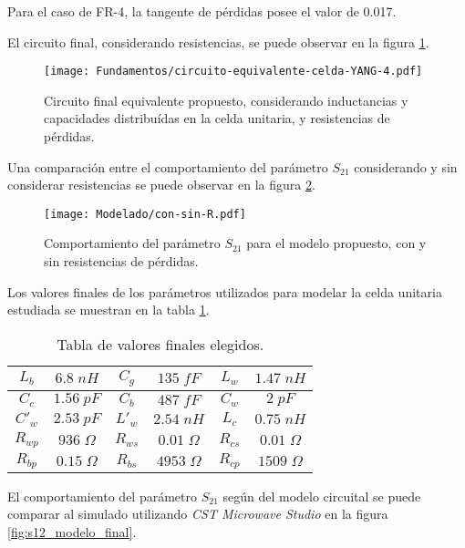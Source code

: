 Para el caso de FR-4, la tangente de pérdidas posee el valor de 0.017.

El circuito final, considerando resistencias, se puede observar en la figura \ref{fig:modelo-circuital-todojunto-conR}.

\begin{figure}[h]
	\centering
	\texttt{[image: Fundamentos/circuito-equivalente-celda-YANG-4.pdf]}
	\caption{Circuito final equivalente propuesto, considerando inductancias y capacidades distribuídas en la celda unitaria, y resistencias de pérdidas.}
	\label{fig:modelo-circuital-todojunto-conR}
\end{figure}

Una comparación entre el comportamiento del parámetro $S_{21}$ considerando y sin considerar resistencias se puede observar en la figura \ref{fig:con-sin-R}.

\begin{figure}[h]
	\centering
	\texttt{[image: Modelado/con-sin-R.pdf]}
	\caption{Comportamiento del parámetro $S_{21}$ para el modelo propuesto, con y sin resistencias de pérdidas.}
	\label{fig:con-sin-R}
\end{figure}

Los valores finales de los parámetros utilizados para modelar la celda unitaria estudiada se muestran en la tabla \ref{table:valoresFinalesModelo}.

\begin{table}
	\centering
	\begin{tabular}{| c c | c c | c c |}
		\hline 
		$L_b$ & $6.8\; nH$ & $C_g$ & $135\; fF$ & $L_w$ & $1.47\; nH$ \\
		\hline
		$C_c$ & $1.56\; pF$ & $C_b$ & $487 \;fF$ & $C_w$ & $2 \; pF$\\
		\hline
		$C'_w$ & $2.53\; pF$ & $L'_w$ & $2.54\; nH$ & $L_c$ & $0.75\; nH$\\
		\hline
		$R_{wp}$ & $936\; \Omega$ & $R_{ws}$ & $0.01\; \Omega$ & $R_{cs}$ & $0.01\; \Omega$\\
		\hline
		$R_{bp}$ & $0.15\; \Omega$ & $R_{bs}$ & $4953\; \Omega$ & $R_{cp}$ & $1509\; \Omega$\textbf{}\\
		\hline
	\end{tabular}
	\caption{Tabla de valores finales elegidos.}
	\label{table:valoresFinalesModelo}
\end{table}

El comportamiento del parámetro $S_{21}$ según del modelo circuital se puede comparar al simulado utilizando \textit{CST Microwave Studio} en la figura \ref{fig:s12_modelo_final}.


